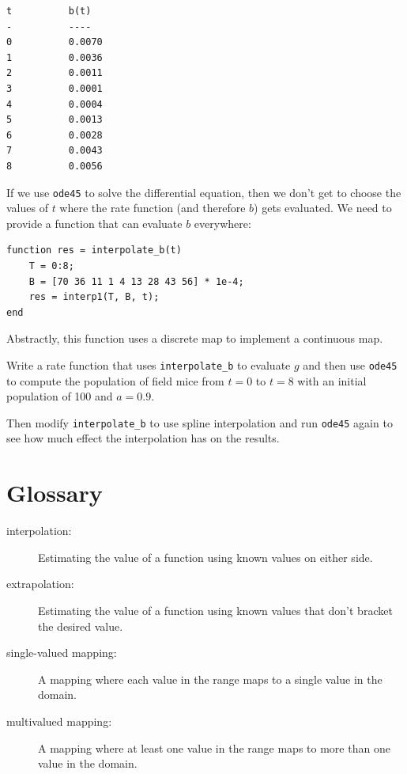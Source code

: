 \documentclass[
]{book}
\begin{document}
\begin{verbatim}
t          b(t)
-          ----
0          0.0070
1          0.0036
2          0.0011
3          0.0001
4          0.0004
5          0.0013
6          0.0028
7          0.0043
8          0.0056
\end{verbatim}

If we use {\tt ode45} to solve the differential equation, then we
don't get to choose the values of $t$ where the rate function
(and therefore $b$) gets evaluated.  We need to provide a function
that can evaluate $b$ everywhere:

\begin{verbatim}
function res = interpolate_b(t)
    T = 0:8;
    B = [70 36 11 1 4 13 28 43 56] * 1e-4;
    res = interp1(T, B, t);
end
\end{verbatim}

Abstractly, this function uses a discrete map to implement a
continuous map.

\begin{ex}
Write a rate function that uses
{\tt interpolate\_b} to evaluate $g$ and then
use {\tt ode45} to compute the population of field mice
from $t=0$ to $t=8$ with an initial population of 100 and
$a=0.9$.

Then modify {\tt interpolate\_b} to use spline interpolation
and run {\tt ode45} again to see how much effect the interpolation
has on the results.
\end{ex}

\section{Glossary}

\begin{description}

\item[interpolation:] Estimating the value of a function using
known values on either side.

\item[extrapolation:] Estimating the value of a function using
known values that don't bracket the desired value.

\item[single-valued mapping:] A mapping where each value in the
range maps to a single value in the domain.

\item[multivalued mapping:] A mapping where at least one value in
the range maps to more than one value in the domain.

\end{description}
\end{document}
